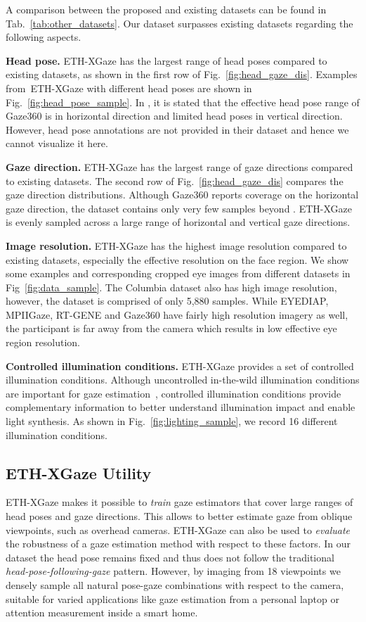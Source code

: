 \documentclass[runningheads]{llncs}
\newcommand{\datasetname}{ETH-XGaze\xspace}
\begin{document}
A comparison between the proposed and existing datasets can be found in Tab.~\ref{tab:other_datasets}.
Our dataset surpasses existing datasets regarding the following aspects.

\textbf{Head pose.} \datasetname has the largest range of head poses compared to existing datasets, as shown in the first row of Fig.~\ref{fig:head_gaze_dis}. Examples from~\datasetname with different head poses are shown in Fig.~\ref{fig:head_pose_sample}.
In \cite{kellnhofer2019gaze360}, it is stated that the effective head pose range of Gaze360 is  in horizontal direction and limited head poses in vertical direction. However, head pose annotations are not provided in their dataset and hence we cannot visualize it here.

\textbf{Gaze direction.} \datasetname has the largest range of gaze directions compared to existing datasets.
The second row of Fig.~\ref{fig:head_gaze_dis} compares the gaze direction distributions.
Although Gaze360 reports  coverage on the horizontal gaze direction, the dataset contains only very few samples beyond .
\datasetname is evenly sampled across a large range of horizontal and vertical gaze directions.

\textbf{Image resolution.} \datasetname has the highest image resolution compared to existing datasets, especially the effective resolution on the face region.
We show some examples and corresponding cropped eye images from different datasets in Fig~\ref{fig:data_sample}.
The Columbia dataset also has high image resolution, however, the dataset is comprised of only 5,880 samples.
While EYEDIAP, MPIIGaze, RT-GENE and Gaze360 have fairly high resolution imagery as well, the participant is far away from the camera which results in low effective eye region resolution.

\textbf{Controlled illumination conditions.} \datasetname provides a set of controlled illumination conditions.
Although uncontrolled in-the-wild illumination conditions are important for gaze estimation~\cite{zhang2019mpiigaze,krafka2016eye}, controlled illumination conditions provide complementary information to better understand illumination impact and enable light synthesis.
As shown in Fig.~\ref{fig:lighting_sample}, we record 16 different illumination conditions.

\subsection{\datasetname Utility}
\datasetname makes it possible to \emph{train} gaze estimators that cover large ranges of head poses and gaze directions. This allows to better estimate gaze from oblique viewpoints, such as overhead cameras.
\datasetname can also be used to \emph{evaluate} the robustness of a gaze estimation method with respect to these factors.
In our dataset the head pose remains fixed and thus does not follow the traditional \emph{head-pose-following-gaze} pattern. However, by imaging from 18 viewpoints we densely sample all natural pose-gaze combinations with respect to the camera, suitable for varied applications like gaze estimation from a personal laptop or attention measurement inside a smart home.
\end{document}
